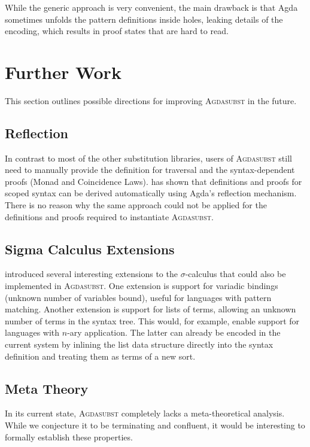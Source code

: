 \documentclass[screen,nonacm]{acmart}
\begin{document}
\noindent\begin{minipage}[t]{0.48\linewidth}
      \raggedright{}
      \GDescL{}
\end{minipage}
\begin{minipage}[t]{0.48\linewidth}
      \raggedright{}
      \GPattern{}
\end{minipage}

\noindent While the
generic approach is very convenient, the main drawback is that Agda sometimes
unfolds the pattern definitions inside holes, leaking details of the encoding,
which results in proof states that are hard to read.

\section{Further Work}\label{sec:wrk}
This section outlines possible directions for improving \textsc{Agdasubst} in
the future.

\subsection*{Reflection}
In contrast to most of the other substitution libraries, users of
\textsc{Agdasubst} still need to manually provide the definition for traversal
and the syntax-dependent proofs (Monad and Coincidence Laws).
\citet{saffrich:LIPIcs.ITP.2024.32} has shown that definitions and proofs for
scoped syntax can be derived automatically using Agda's reflection mechanism.
There is no reason why the same approach could not be applied for the
definitions and proofs required to instantiate \textsc{Agdasubst}.

\subsection*{Sigma Calculus Extensions}
\citet{Stark:2020:Mechanising} introduced several interesting extensions to the $σ$-calculus that could also be implemented in \textsc{Agdasubst}. One extension is support for variadic bindings (unknown number of variables bound), useful for languages with pattern matching. Another extension is support for lists of terms, allowing an unknown number of terms in the syntax tree. This would, for example, enable support for languages with $n$-ary application.
The latter can already be encoded in the current system by inlining the list
data structure directly into the syntax definition and treating
them as terms of a new sort.

\subsection*{Meta Theory}
In its current state, \textsc{Agdasubst} completely lacks a meta-theoretical
analysis. While we conjecture it to be terminating and confluent, it would be
interesting to formally establish these properties.
\end{document}
